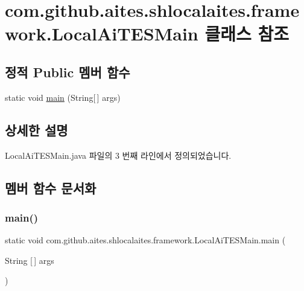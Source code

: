 \hypertarget{classcom_1_1github_1_1aites_1_1shlocalaites_1_1framework_1_1_local_ai_t_e_s_main}{}\section{com.\+github.\+aites.\+shlocalaites.\+framework.\+Local\+Ai\+T\+E\+S\+Main 클래스 참조}
\label{classcom_1_1github_1_1aites_1_1shlocalaites_1_1framework_1_1_local_ai_t_e_s_main}
\subsection*{정적 Public 멤버 함수}
\begin{DoxyCompactItemize}
\item 
static void \mbox{\hyperlink{classcom_1_1github_1_1aites_1_1shlocalaites_1_1framework_1_1_local_ai_t_e_s_main_ad8f513d56d55ce52c030dac60b5181db}{main}} (String\mbox{[}$\,$\mbox{]} args)
\end{DoxyCompactItemize}


\subsection{상세한 설명}


Local\+Ai\+T\+E\+S\+Main.\+java 파일의 3 번째 라인에서 정의되었습니다.



\subsection{멤버 함수 문서화}
\mbox{\label{classcom_1_1github_1_1aites_1_1shlocalaites_1_1framework_1_1_local_ai_t_e_s_main_ad8f513d56d55ce52c030dac60b5181db}} 
\subsubsection{\texorpdfstring{main()}{main()}}
{\footnotesize\ttfamily static void com.\+github.\+aites.\+shlocalaites.\+framework.\+Local\+Ai\+T\+E\+S\+Main.\+main (\begin{DoxyParamCaption}\item[{String \mbox{[}$\,$\mbox{]}}]{args }\end{DoxyParamCaption})\hspace{0.3cm}{\ttfamily [static]}}



